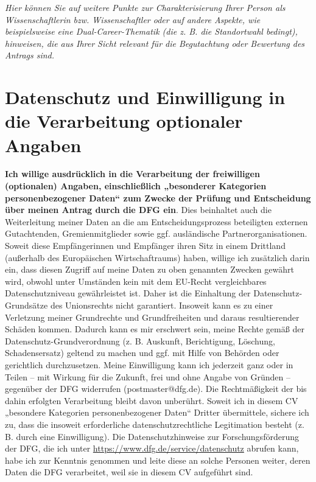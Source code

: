 \documentclass[a4paper,11pt]{article}
\begin{document}
\emph{Hier können Sie auf weitere Punkte zur Charakterisierung Ihrer Person als Wissenschaftlerin bzw. Wissenschaftler oder auf andere Aspekte, wie beispielsweise eine Dual-Career-Thematik (die z.  B. die Standortwahl bedingt), hinweisen, die aus Ihrer Sicht relevant für die Begutachtung oder Bewertung des Antrags sind.}

\section*{Datenschutz und Einwilligung in die Verarbeitung optionaler Angaben}
\footnotesize

\noindent
\textbf{Ich willige ausdrücklich in die Verarbeitung der freiwilligen
(optionalen) Angaben, einschließlich „besonderer Kategorien
personenbezogener Daten“ zum Zwecke der Prüfung und Entscheidung über
meinen Antrag durch die DFG ein}. Dies beinhaltet auch die
Weiterleitung meiner Daten an die am Entscheidungsprozess beteiligten
externen Gutachtenden, Gremienmitglieder sowie ggf. ausländische
Partnerorganisationen. Soweit diese Empfängerinnen und Empfänger ihren
Sitz in einem Drittland (außerhalb des Europäischen Wirtschaftraums)
haben, willige ich zusätzlich darin ein, dass diesen Zugriff auf meine
Daten zu oben genannten Zwecken gewährt wird, obwohl unter Umständen
kein mit dem EU-Recht vergleichbares Datenschutzniveau gewährleistet
ist. Daher ist die Einhaltung der Datenschutz-Grundsätze des
Unionsrechts nicht garantiert. Insoweit kann es zu einer Verletzung
meiner Grundrechte und Grundfreiheiten und daraus resultierender
Schäden kommen. Dadurch kann es mir erschwert sein, meine Rechte gemäß
der Datenschutz-Grundverordnung (z. B. Auskunft, Berichtigung,
Löschung, Schadensersatz) geltend zu machen und ggf. mit Hilfe von
Behörden oder gerichtlich durchzusetzen.
%
Meine Einwilligung kann ich jederzeit ganz oder in Teilen – mit
Wirkung für die Zukunft, frei und ohne Angabe von Gründen – gegenüber
der DFG widerrufen (postmaster@dfg.de). Die Rechtmäßigkeit der bis
dahin erfolgten Verarbeitung bleibt davon unberührt. Soweit ich in
diesem CV „besondere Kategorien personenbezogener Daten“ Dritter
übermittele, sichere ich zu, dass die insoweit erforderliche
datenschutzrechtliche Legitimation besteht (z. B. durch eine
Einwilligung).
%
Die Datenschutzhinweise zur Forschungsförderung der DFG, die ich unter
\url{https://www.dfg.de/service/datenschutz} abrufen kann, habe ich
zur Kenntnis genommen und leite diese an solche Personen weiter, deren
Daten die DFG verarbeitet, weil sie in diesem CV aufgeführt sind.

\end{document}
